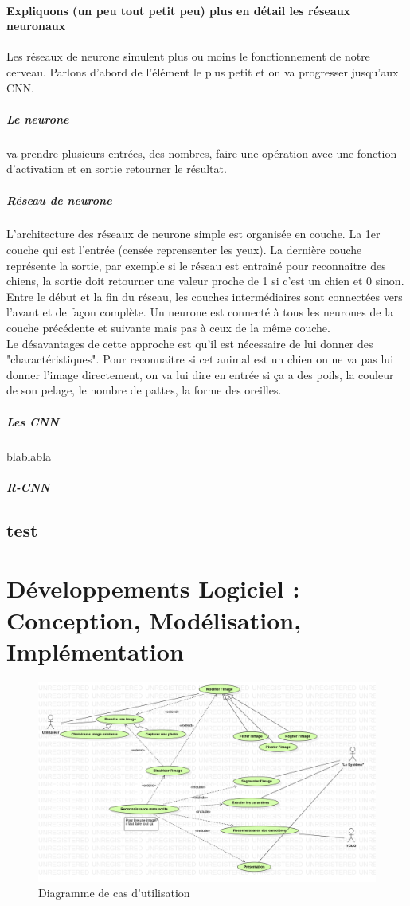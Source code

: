 \documentclass[a4paper]{article}
\begin{document}
				\paragraph{Expliquons (un peu tout petit peu) plus en détail les réseaux neuronaux}
					Les réseaux de neurone simulent plus ou moins le fonctionnement de notre cerveau. Parlons d'abord de l'élément le plus petit et on va progresser jusqu'aux CNN.
					\subparagraph{Le neurone} va prendre plusieurs entrées, des nombres, faire une opération avec une fonction d'activation et en sortie retourner le résultat.
					\subparagraph{Réseau de neurone} L'architecture des réseaux de neurone simple est organisée en couche. La 1er couche qui est l'entrée (censée reprensenter les yeux).
						La dernière couche représente la sortie, par exemple si le réseau est entrainé pour reconnaitre des chiens, la sortie doit retourner une valeur proche de 1 si c'est un chien et 0 sinon.
						Entre le début et la fin du réseau, les couches intermédiaires sont connectées vers l'avant et de façon complète. Un neurone est connecté à tous les neurones de la couche précédente et suivante mais pas à ceux de la même couche.
					\\Le désavantages de cette approche est qu'il est nécessaire de lui donner des "charactéristiques". Pour reconnaitre si cet animal est un chien on ne va pas lui donner l'image directement, on va lui dire en entrée si ça a des poils, la couleur de son pelage, le nombre de pattes, la forme des oreilles.
					\subparagraph{Les CNN} blablabla
					\subparagraph{R-CNN}
		\subsection*{test}
			\blindtext
	\newpage
	\section{Développements Logiciel : Conception, Modélisation, Implémentation}
		\begin{figure}[h]
			\includegraphics[width=\textwidth]{UseCaseDiagram.png}
			\centering
			\caption{Diagramme de cas d'utilisation}
			\label{fig:useCaseDiagram}
		\end{figure}
\end{document}
